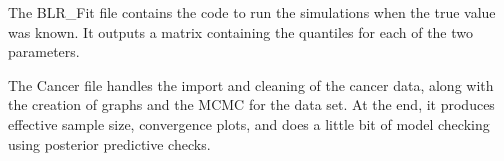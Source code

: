 \documentclass[12pt]{article}
\begin{document}
The BLR\_Fit file contains the code to run the simulations when the true value was known. It outputs a matrix containing the quantiles for each of the two parameters.


The Cancer file handles the import and cleaning of the cancer data, along with the creation of graphs and the MCMC for the data set. At the end, it produces effective sample size, convergence plots, and does a little bit of model checking using posterior predictive checks.

\end{document}
